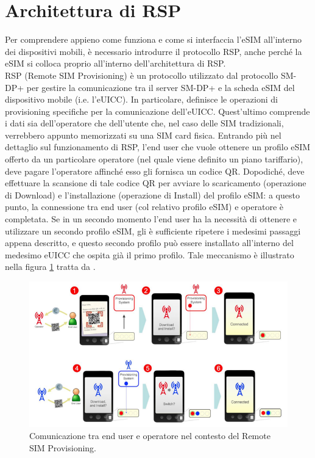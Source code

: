 \documentclass[10pt, twoside, openany]{book}
\begin{document}
\section{Architettura di RSP}
Per comprendere appieno come funziona e come si interfaccia l'eSIM all'interno dei dispositivi mobili, è necessario introdurre il protocollo RSP, anche perché la eSIM si colloca proprio all'interno dell'architettura di RSP.\\
RSP (Remote SIM Provisioning) è un protocollo utilizzato dal protocollo SM-DP+ per gestire la comunicazione tra il server SM-DP+ e la scheda eSIM del dispositivo mobile (i.e. l'eUICC). In particolare, definisce le operazioni di provisioning specifiche per la comunicazione dell'eUICC. Quest'ultimo comprende i dati sia dell'operatore che dell'utente che, nel caso delle SIM tradizionali, verrebbero appunto memorizzati su una SIM card fisica. Entrando più nel dettaglio sul funzionamento di RSP, l'end user che vuole ottenere un profilo eSIM offerto da un particolare operatore (nel quale viene definito un piano tariffario), deve pagare l'operatore affinché esso gli fornisca un codice QR. Dopodiché, deve effettuare la scansione di tale codice QR per avviare lo scaricamento (operazione di Download) e l'installazione (operazione di Install) del profilo eSIM: a questo punto, la connessione tra end user (col relativo profilo eSIM) e operatore è completata. Se in un secondo momento l'end user ha la necessità di ottenere e utilizzare un secondo profilo eSIM, gli è sufficiente ripetere i medesimi passaggi appena descritto, e questo secondo profilo può essere installato all'interno del medesimo eUICC che ospita già il primo profilo. Tale meccanismo è illustrato nella figura \ref{fig:RSP-functioning} tratta da \cite{GSMA-whitepaper}.
\begin{figure}
\includegraphics[width=\linewidth]{RSP-functioning.png}
\caption{Comunicazione tra end user e operatore nel contesto del Remote SIM Provisioning.}
\label{fig:RSP-functioning}
\end{figure}
\end{document}

